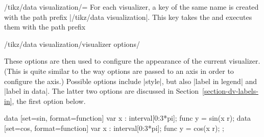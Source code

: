 \begin{key}{/tikz/data visualization/=}
    For each visualizer, a key of the same name is created with the path prefix
    |/tikz/data visualization|. This key takes the  and executes
    them with the path prefix
\begin{codeexample}
/tikz/data visualization/visualizer options/
\end{codeexample}
    These options are then used to configure the appearance of the current
    visualizer. (This is quite similar to the way options are passed to an axis
    in order to configure the axis.) Possible options include |style|, but also
    |label in legend| and |label in data|. The latter two options are discussed
    in Section~\ref{section-dv-labels-in}, the first option below.
\begin{codeexample}[
    width=7cm,
    preamble={\usetikzlibrary{datavisualization.formats.functions}},
]
\tikz \datavisualization
 [scientific axes=clean,
  visualize as smooth line/.list={sin, cos},
  sin={style=red},
  cos={style=blue}]
data [set=sin, format=function] {
  var x : interval[0:3*pi];
  func y = sin(\value x r);
}
data [set=cos, format=function] {
  var x : interval[0:3*pi];
  func y = cos(\value x r);
};
\end{codeexample}
\end{key}

